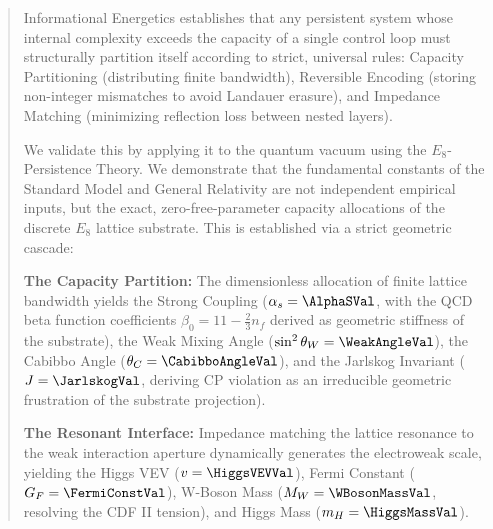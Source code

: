 \begin{abstract}

Informational Energetics establishes that any persistent system whose internal complexity exceeds the capacity of a single control loop must structurally partition itself according to strict, universal rules: Capacity Partitioning (distributing finite bandwidth), Reversible Encoding (storing non-integer mismatches to avoid Landauer erasure), and Impedance Matching (minimizing reflection loss between nested layers).

We validate this by applying it to the quantum vacuum using the $E_8$-Persistence Theory. We demonstrate that the fundamental constants of the Standard Model and General Relativity are not independent empirical inputs, but the exact, zero-free-parameter capacity allocations of the discrete $E_8$ lattice substrate. This is established via a strict geometric cascade:

\textbf{The Capacity Partition:} The dimensionless allocation of finite lattice bandwidth yields the Strong Coupling ($\alpha_s = \AlphaSVal$, with the QCD beta function coefficients $\beta_0 = 11 - \frac{2}{3}n_f$ derived as geometric stiffness of the substrate), the Weak Mixing Angle ($\sin^2\theta_W = \WeakAngleVal$), the Cabibbo Angle ($\theta_C = \CabibboAngleVal$), and the Jarlskog Invariant ($J = \JarlskogVal$, deriving CP violation as an irreducible geometric frustration of the substrate projection).

\textbf{The Resonant Interface:} Impedance matching the lattice resonance to the weak interaction aperture dynamically generates the electroweak scale, yielding the Higgs VEV ($v = \HiggsVEVVal$), Fermi Constant ($G_F = \FermiConstVal$), W-Boson Mass ($M_W = \WBosonMassVal$, resolving the CDF II tension), and Higgs Mass ($m_H = \HiggsMassVal$).


\end{abstract}
